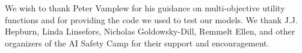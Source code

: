 We wish to thank Peter Vamplew for his guidance on multi-objective utility functions and for providing the code we used to test our models. We thank J.J. Hepburn, Linda Linsefors, Nicholas Goldowsky-Dill, Remmelt Ellen, and other organizers of the AI Safety Camp for their support and encouragement.